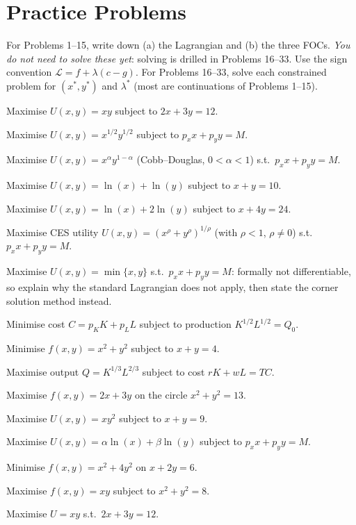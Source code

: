 \section{Practice Problems}

For Problems 1--15, write down (a) the Lagrangian and (b) the three FOCs.
\emph{You do not need to solve these yet}: solving is drilled in
Problems 16--33. Use the sign convention
$\mathcal{L} = f + \lambda(c - g)$. For Problems 16--33, solve each
constrained problem for $(x^*, y^*)$ and $\lambda^*$ (most are
continuations of Problems 1--15).

\begin{problems}
  \item Maximise $U(x, y) = x y$ subject to $2 x + 3 y = 12$.
  \item Maximise $U(x, y) = x^{1/2} y^{1/2}$ subject to $p_x x + p_y y = M$.
  \item Maximise $U(x, y) = x^\alpha y^{1 - \alpha}$ (Cobb--Douglas, $0 < \alpha < 1$) s.t.\ $p_x x + p_y y = M$.
  \item Maximise $U(x, y) = \ln(x) + \ln(y)$ subject to $x + y = 10$.
  \item Maximise $U(x, y) = \ln(x) + 2 \ln(y)$ subject to $x + 4 y = 24$.
  \item Maximise CES utility $U(x, y) = (x^\rho + y^\rho)^{1/\rho}$ (with $\rho < 1$, $\rho \neq 0$) s.t.\ $p_x x + p_y y = M$.
  \item Maximise $U(x, y) = \min\{x, y\}$ s.t.\ $p_x x + p_y y = M$: formally not differentiable, so explain why the standard Lagrangian does not apply, then state the corner solution method instead.
  \item Minimise cost $C = p_K K + p_L L$ subject to production $K^{1/2} L^{1/2} = Q_0$.
  \item Minimise $f(x, y) = x^2 + y^2$ subject to $x + y = 4$.
  \item Maximise output $Q = K^{1/3} L^{2/3}$ subject to cost $r K + w L = TC$.
  \item Maximise $f(x, y) = 2 x + 3 y$ on the circle $x^2 + y^2 = 13$.
  \item Maximise $U(x, y) = x y^2$ subject to $x + y = 9$.
  \item Maximise $U(x, y) = \alpha \ln(x) + \beta \ln(y)$ subject to $p_x x + p_y y = M$.
  \item Minimise $f(x, y) = x^2 + 4 y^2$ on $x + 2 y = 6$.
  \item Maximise $f(x, y) = x y$ subject to $x^2 + y^2 = 8$.
  \item Maximise $U = x y$ s.t.\ $2 x + 3 y = 12$.

\end{problems}
